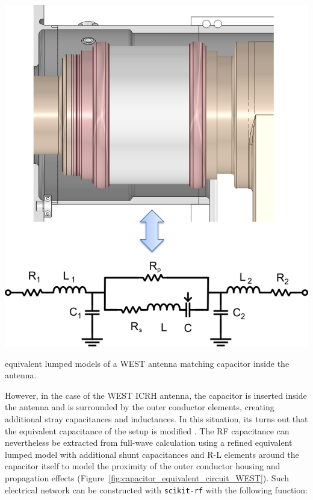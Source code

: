 \begin{marginfigure}
	\centering
	\includegraphics[width=1.0\linewidth]{figures/chap3/WEST_ICRH/capacitor_equivalent_circuit_WEST}
	\caption{equivalent lumped models of a WEST antenna matching capacitor inside the antenna.}
	\label{fig:capacitor_equivalent_circuit_WEST}	  
\end{marginfigure}

However, in the case of the WEST ICRH antenna, the capacitor is inserted inside the antenna and is surrounded by the outer conductor elements, creating additional stray capacitances and inductances. In this situation, its turns out that the equivalent capacitance of the setup is modified \cite{helou2018}. The RF capacitance can nevertheless be extracted from full-wave calculation using a refined equivalent lumped model with additional shunt capacitances and R-L elements around the capacitor itself to model the proximity of the outer conductor housing and propagation effects (Figure~\ref{fig:capacitor_equivalent_circuit_WEST}). Such electrical network can be constructed with \texttt{scikit-rf} with the following function:

